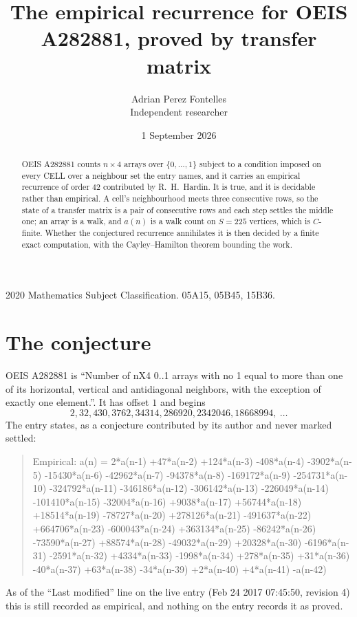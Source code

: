 \documentclass[11pt,a4paper]{article}
\title{The empirical recurrence for OEIS A282881, proved by transfer matrix}
\author{Adrian Perez Fontelles\\ \small Independent researcher}
\date{1 September 2026}
\theoremstyle{plain}
\theoremstyle{definition}
\begin{document}
\maketitle

\begin{abstract}
OEIS A282881 counts $n\times4$ arrays over $\{0,\dots,1\}$ subject to a condition imposed on
every CELL over a neighbour set the entry names, and it carries an empirical recurrence of
order $42$ contributed by R.~H.~Hardin. It is true, and it is decidable rather than
empirical. A cell's neighbourhood meets three consecutive rows, so the state of a transfer
matrix is a pair of consecutive rows and each step settles the middle one; an array is a
walk, and $a(n)$ is a walk count on $S=225$ vertices, which is $C$-finite. Whether the
conjectured recurrence annihilates it is then decided by a finite exact computation, with the
Cayley--Hamilton theorem bounding the work.
\end{abstract}

\noindent\small 2020 Mathematics Subject Classification. 05A15, 05B45, 15B36.\normalsize

\section{The conjecture}

OEIS A282881 is ``Number of nX4 0..1 arrays with no 1 equal to more than one of its horizontal, vertical and antidiagonal neighbors, with the exception of exactly one element.''. It has offset $1$ and begins
\[
2, 32, 430, 3762, 34314, 286920, 2342046, 18668994,\ \dots
\]
The entry states, as a conjecture contributed by its author and never marked settled:
\begin{quote}
Empirical: a(n) = 2*a(n-1) +47*a(n-2) +124*a(n-3) -408*a(n-4) -3902*a(n-5) -15430*a(n-6) -42962*a(n-7) -94378*a(n-8) -169172*a(n-9) -254731*a(n-10) -324792*a(n-11) -346186*a(n-12) -306142*a(n-13) -226049*a(n-14) -101410*a(n-15) -32004*a(n-16) +9038*a(n-17) +56744*a(n-18) +18514*a(n-19) -78727*a(n-20) +278126*a(n-21) -491637*a(n-22) +664706*a(n-23) -600043*a(n-24) +363134*a(n-25) -86242*a(n-26) -73590*a(n-27) +88574*a(n-28) -49032*a(n-29) +20328*a(n-30) -6196*a(n-31) -2591*a(n-32) +4334*a(n-33) -1998*a(n-34) +278*a(n-35) +31*a(n-36) -40*a(n-37) +63*a(n-38) -34*a(n-39) +2*a(n-40) +4*a(n-41) -a(n-42)
\end{quote}
As of the ``Last modified'' line on the live entry (Feb 24 2017 07:45:50, revision 4) this is still
recorded as empirical, and nothing on the entry records it as proved.
\end{document}
